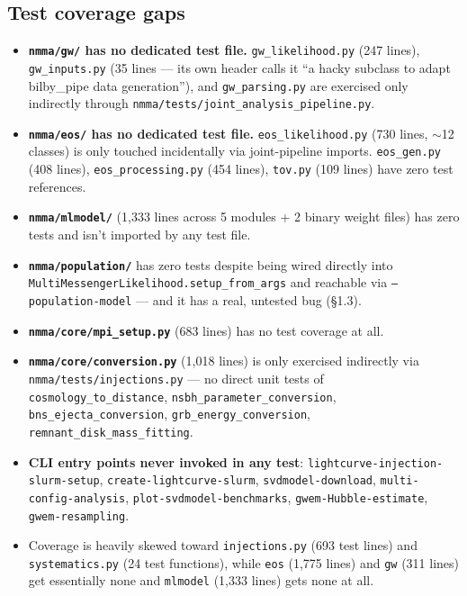 \documentclass[10pt]{article}
\newcommand{\code}[1]{\texttt{#1}}
\begin{document}
\subsection{Test coverage gaps}
\begin{itemize}
\item \textbf{\code{nmma/gw/} has no dedicated test file.} \code{gw\_likelihood.py}
  (247 lines), \code{gw\_inputs.py} (35 lines --- its own header calls it ``a hacky
  subclass to adapt bilby\_pipe data generation''), and \code{gw\_parsing.py} are
  exercised only indirectly through \code{nmma/tests/joint\_analysis\_pipeline.py}.
\item \textbf{\code{nmma/eos/} has no dedicated test file.}
  \code{eos\_likelihood.py} (730 lines, $\sim$12 classes) is only touched
  incidentally via joint-pipeline imports. \code{eos\_gen.py} (408 lines),
  \code{eos\_processing.py} (454 lines), \code{tov.py} (109 lines) have zero test
  references.
\item \textbf{\code{nmma/mlmodel/}} (1{,}333 lines across 5 modules + 2 binary
  weight files) has zero tests and isn't imported by any test file.
\item \textbf{\code{nmma/population/}} has zero tests despite being wired directly
  into \code{MultiMessengerLikelihood.setup\_from\_args} and reachable via
  \code{--population-model} --- and it has a real, untested bug (\S1.3).
\item \textbf{\code{nmma/core/mpi\_setup.py}} (683 lines) has no test coverage at
  all.
\item \textbf{\code{nmma/core/conversion.py}} (1{,}018 lines) is only exercised
  indirectly via \code{nmma/tests/injections.py} --- no direct unit tests of
  \code{cosmology\_to\_distance}, \code{nsbh\_parameter\_conversion},
  \code{bns\_ejecta\_conversion}, \code{grb\_energy\_conversion},
  \code{remnant\_disk\_mass\_fitting}.
\item \textbf{CLI entry points never invoked in any test}:
  \code{lightcurve-injection-slurm-setup}, \code{create-lightcurve-slurm},
  \code{svdmodel-download}, \code{multi-config-analysis},
  \code{plot-svdmodel-benchmarks}, \code{gwem-Hubble-estimate},
  \code{gwem-resampling}.
\item Coverage is heavily skewed toward \code{injections.py} (693 test lines) and
  \code{systematics.py} (24 test functions), while \code{eos} (1{,}775 lines) and
  \code{gw} (311 lines) get essentially none and \code{mlmodel} (1{,}333 lines)
  gets none at all.
\end{itemize}
\end{document}

